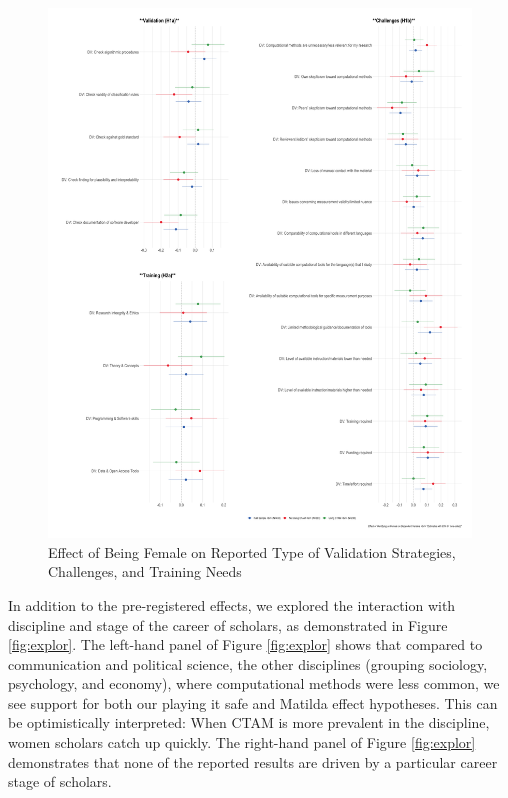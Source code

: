 \documentclass[
]{ccr}
\begin{document}
\begin{figure}[H]

{\centering \includegraphics[width=1\textwidth,height=\textheight]{figures/types-dv-1.png}

}

\caption{\label{fig:dv-types}Effect of Being Female on Reported Type of
Validation Strategies, Challenges, and Training Needs}

\end{figure}

In addition to the pre-registered effects, we explored the interaction
with discipline and stage of the career of scholars, as demonstrated in
Figure \ref{fig:explor}. The left-hand panel of Figure \ref{fig:explor}
shows that compared to communication and political science, the other
disciplines (grouping sociology, psychology, and economy), where
computational methods were less common, we see support for both our
playing it safe and Matilda effect hypotheses. This can be
optimistically interpreted: When CTAM is more prevalent in the
discipline, women scholars catch up quickly. The right-hand panel of
Figure \ref{fig:explor} demonstrates that none of the reported results
are driven by a particular career stage of scholars.
\end{document}
